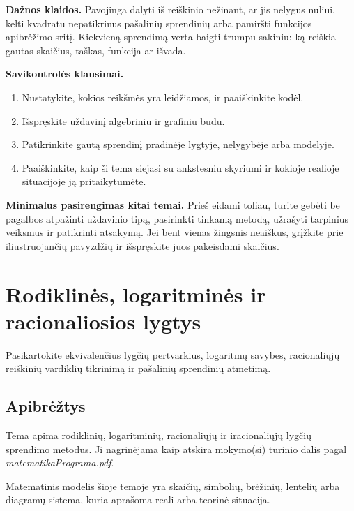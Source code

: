 \textbf{Dažnos klaidos.} Pavojinga dalyti iš reiškinio nežinant, ar jis nelygus nuliui, kelti kvadratu nepatikrinus pašalinių sprendinių arba pamiršti funkcijos apibrėžimo sritį. Kiekvieną sprendimą verta baigti trumpu sakiniu: ką reiškia gautas skaičius, taškas, funkcija ar išvada.

\textbf{Savikontrolės klausimai.}
\begin{enumerate}[label=\arabic*.]
\item Nustatykite, kokios reikšmės yra leidžiamos, ir paaiškinkite kodėl.
\item Išspręskite uždavinį algebriniu ir grafiniu būdu.
\item Patikrinkite gautą sprendinį pradinėje lygtyje, nelygybėje arba modelyje.
\item Paaiškinkite, kaip ši tema siejasi su ankstesniu skyriumi ir kokioje realioje situacijoje ją pritaikytumėte.
\end{enumerate}

\textbf{Minimalus pasirengimas kitai temai.} Prieš eidami toliau, turite gebėti be pagalbos atpažinti uždavinio tipą, pasirinkti tinkamą metodą, užrašyti tarpinius veiksmus ir patikrinti atsakymą. Jei bent vienas žingsnis neaiškus, grįžkite prie iliustruojančių pavyzdžių ir išspręskite juos pakeisdami skaičius.

\section{Rodiklinės, logaritminės ir racionaliosios lygtys}\label{sec:rodiklines-logaritmines-ir-racionaliosios-lygtys}

\begin{tcolorbox}[title=Prieš pradedant, colback=green!5]
Pasikartokite ekvivalenčius lygčių pertvarkius, logaritmų savybes, racionaliųjų reiškinių vardiklių tikrinimą ir pašalinių sprendinių atmetimą.
\end{tcolorbox}
\subsection{Apibrėžtys}
\begin{apibreztis}
Tema apima rodiklinių, logaritminių, racionaliųjų ir iracionaliųjų lygčių sprendimo metodus. Ji nagrinėjama kaip atskira mokymo(si) turinio dalis pagal \emph{matematikaPrograma.pdf}.
\end{apibreztis}
\begin{apibreztis}
Matematinis modelis šioje temoje yra skaičių, simbolių, brėžinių, lentelių arba diagramų sistema, kuria aprašoma reali arba teorinė situacija.
\end{apibreztis}

